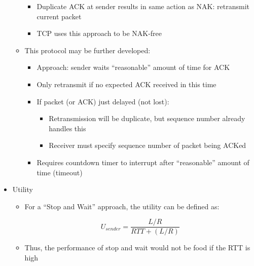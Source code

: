 \begin{itemize}
\begin{itemize}
\begin{itemize}
\begin{itemize}
            \end{itemize}

          \item Duplicate ACK at sender results in same action as NAK: retransmit current packet

          \item TCP uses this approach to be NAK-free

        \end{itemize}

      \item This protocol may be further developed:

        \begin{itemize}

          \item Approach: sender waits ``reasonable'' amount of time for ACK

          \item Only retransmit if no expected ACK received in this time

          \item If packet (or ACK) just delayed (not lost):

            \begin{itemize}

              \item Retransmission will be duplicate, but sequence number already handles this

              \item Receiver must specify sequence number of packet being ACKed

            \end{itemize}

          \item Requires countdown timer to interrupt after “reasonable” amount of time (timeout)

        \end{itemize}

    \end{itemize}

  \item Utility

    \begin{itemize}

      \item For a ``Stop and Wait'' approach, the utility can be defined as:

        $$U_{sender}=\frac{L/R}{RTT+(L/R)}$$

      \item Thus, the performance of stop and wait would not be food if the RTT is high


\end{itemize}
\end{itemize}
